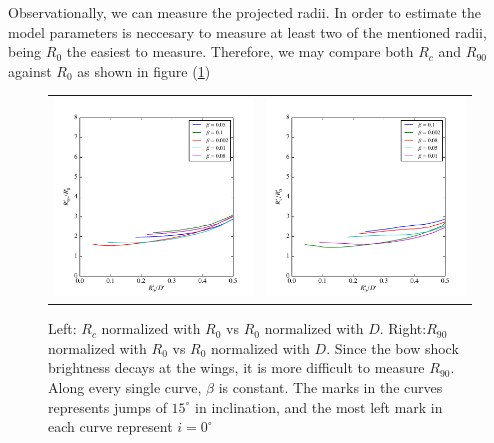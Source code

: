 Observationally, we can measure the projected radii. In order to estimate the model parameters is neccesary to measure at least two of the mentioned radii, being $R_0$ the
easiest to measure. Therefore, we may compare both $R_c$ and $R_{90}$ against $R_0$ as shown in figure (\ref{fig:radii-r0})

\begin{figure}
\begin{tabular}{cc}
\includegraphics[width=0.5\linewidth]{R90-R0-b}&
\includegraphics[width=0.5\linewidth]{Rc-R0-b}
\end{tabular}
\label{fig:radii-r0}
\caption{Left: $R_c$ normalized with $R_0$ vs $R_0$ normalized with $D$. Right:$R_{90}$ normalized with $R_0$ vs $R_0$ normalized with $D$. Since the bow shock brightness decays 
at the wings, it is more difficult to measure $R_{90}$. Along every single curve, $\beta$ is constant. The marks in the curves represents jumps of $15^\circ$ in inclination, and the most left 
mark in each curve represent $i=0^\circ$}
\end{figure}
